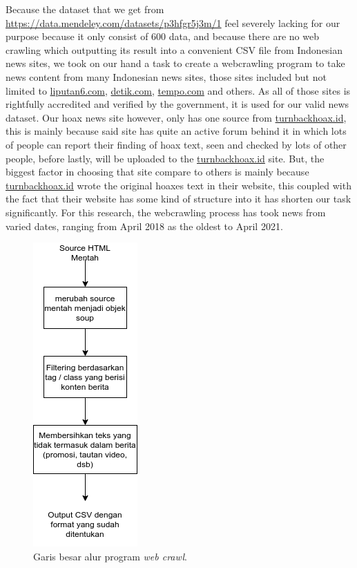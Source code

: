 Because the dataset that we get from \url{https://data.mendeley.com/datasets/p3hfgr5j3m/1} feel severely lacking for our purpose because it only consist of 600 data, and because there are no web crawling which outputting its result into a convenient CSV file from Indonesian news sites, we took on our hand a task to create a webcrawling program to take news content from many Indonesian news sites, those sites included but not limited to \url{liputan6.com}, \url{detik.com}, \url{tempo.com} and others. As all of those sites is rightfully accredited and verified by the government, it is used for our valid news dataset. Our hoax news site however, only has one source from \url{turnbackhoax.id}, this is mainly because said site has quite an active forum behind it in which lots of people can report their finding of hoax text, seen and checked by lots of other people, before lastly, will be uploaded to the \url{turnbackhoax.id} site. But, the biggest factor in choosing that site compare to others is mainly because \url{turnbackhoax.id} wrote the original hoaxes text in their website, this coupled with the fact that their website has some kind of structure into it has shorten our task significantly. For this research, the webcrawling process has took news from varied dates, ranging from April 2018 as the oldest to April 2021.

\begin{figure} [h!]
    \centering
    \includegraphics[width=0.35\linewidth]{gambar/webcrawl_long.png}
    \caption{Garis besar alur program \textit{web crawl}.}
    \label{fig:webcrawl_method}
\end{figure}

